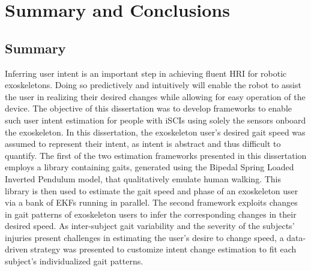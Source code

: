 \chapter{Summary and Conclusions}\label{chapter:conc}
\section{Summary}
Inferring user intent is an important step in achieving fluent HRI for robotic exoskeletons. Doing so predictively and intuitively will enable the robot to assist the user in realizing their desired changes while allowing for easy operation of the device. The objective of this dissertation was to develop frameworks to enable such user intent estimation for people with iSCIs using solely the sensors onboard the exoskeleton. In this dissertation, the exoskeleton user's desired gait speed was assumed to represent their intent, as intent is abstract and thus difficult to quantify. The first of the two estimation frameworks presented in this dissertation employs a library containing gaits, generated using the Bipedal Spring Loaded Inverted Pendulum model, that qualitatively emulate human walking. This library is then used to estimate the gait speed and phase of an exoskeleton user via a bank of EKFs running in parallel. The second framework exploits changes in gait patterns of exoskeleton users to infer the corresponding changes in their desired speed. As inter-subject gait variability and the severity of the subjects' injuries present challenges in estimating the user's desire to change speed, a data-driven strategy was presented to customize intent change estimation to fit each subject's individualized gait patterns.


